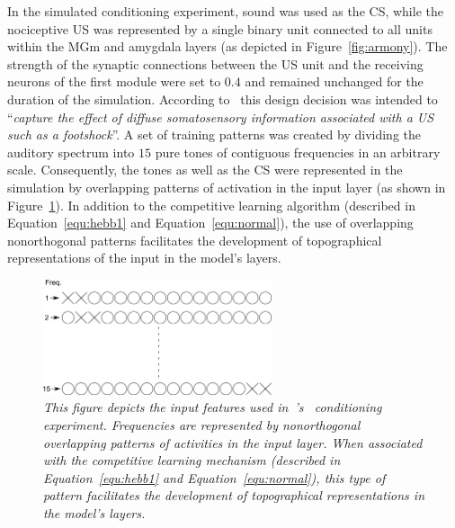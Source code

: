In the simulated conditioning experiment, sound was used as the CS, while the nociceptive US was represented by a single binary unit connected to all units within the MGm and amygdala layers (as depicted in Figure~\ref{fig:armony}). The strength of the synaptic connections between the US unit and the receiving neurons of the first module were set to $0.4$ and remained unchanged for the duration of the simulation. According to~\citet{Armony1995} this design decision was intended to ``\emph{capture the effect of diffuse somatosensory information associated with a US such as a footshock}''. A set of training patterns was created by dividing the auditory spectrum into $15$ pure tones of contiguous frequencies in an arbitrary scale. Consequently, the tones as well as the CS were represented in the simulation by overlapping patterns of activation in the input layer (as shown in Figure~\ref{fig:armony_input_feats}). In addition to the competitive learning algorithm (described in Equation~\ref{equ:hebb1} and Equation~\ref{equ:normal}), the use of overlapping nonorthogonal patterns facilitates the development of topographical representations of the input in the model's layers.\\

\begin{figure}[!htbp]
   \begin{center}
      \includegraphics[width=0.6\textwidth]{Figs/input_features}
      \caption{\textit{This figure depicts the input features used in~\citeauthor{Armony1995}'s~\citeyearpar{Armony1995} conditioning experiment. Frequencies are represented by nonorthogonal overlapping patterns of activities in the input layer. When associated with the competitive learning mechanism (described in Equation~\ref{equ:hebb1} and Equation~\ref{equ:normal}), this type of pattern facilitates the development of topographical representations in the model's layers.}}\label{fig:armony_input_feats}
   \end{center}
\end{figure}

